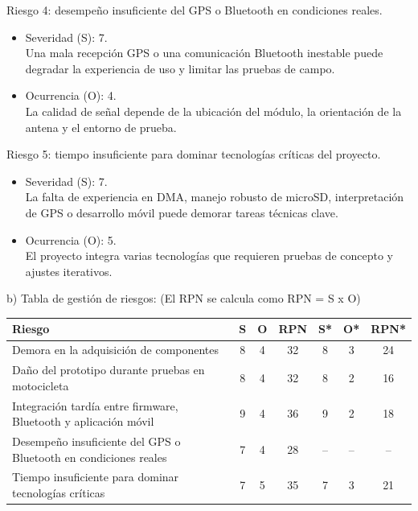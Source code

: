 \documentclass[
11pt, %
]{charter}
\begin{document}
Riesgo 4: desempeño insuficiente del GPS o Bluetooth en condiciones reales.
\begin{itemize}
	\item Severidad (S): 7.\\
	Una mala recepción GPS o una comunicación Bluetooth inestable puede degradar la experiencia de uso y limitar las pruebas de campo.
	\item Ocurrencia (O): 4.\\
	La calidad de señal depende de la ubicación del módulo, la orientación de la antena y el entorno de prueba.
\end{itemize}

Riesgo 5: tiempo insuficiente para dominar tecnologías críticas del proyecto.
\begin{itemize}
	\item Severidad (S): 7.\\
	La falta de experiencia en DMA, manejo robusto de microSD, interpretación de GPS o desarrollo móvil puede demorar tareas técnicas clave.
	\item Ocurrencia (O): 5.\\
	El proyecto integra varias tecnologías que requieren pruebas de concepto y ajustes iterativos.
\end{itemize}

b) Tabla de gestión de riesgos: (El RPN se calcula como RPN = S x O)

\begin{table}[H]
\centering
\begin{tabularx}{\linewidth}{@{}|X|c|c|c|c|c|c|@{}}
\hline
\rowcolor[HTML]{C0C0C0} 
Riesgo & S & O & RPN & S* & O* & RPN* \\ \hline
Demora en la adquisición de componentes & 8 & 4 & 32 & 8 & 3 & 24 \\ \hline
Daño del prototipo durante pruebas en motocicleta & 8 & 4 & 32 & 8 & 2 & 16 \\ \hline
Integración tardía entre firmware, Bluetooth y aplicación móvil & 9 & 4 & 36 & 9 & 2 & 18 \\ \hline
Desempeño insuficiente del GPS o Bluetooth en condiciones reales & 7 & 4 & 28 & -- & -- & -- \\ \hline
Tiempo insuficiente para dominar tecnologías críticas & 7 & 5 & 35 & 7 & 3 & 21 \\ \hline
\end{tabularx}%
\end{table}

\FloatBarrier
\pagebreak
\end{document}
